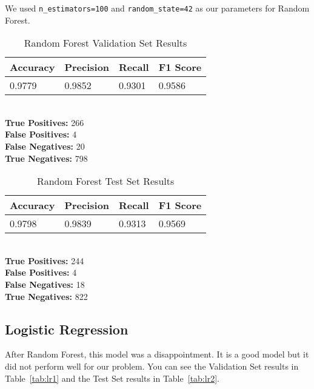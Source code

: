 \documentclass[conference]{IEEEtran}
\begin{document}
We used \verb|n_estimators=100| and \verb|random_state=42| as our parameters for Random Forest.

\begin{table}[H]
    \caption{Random Forest Validation Set Results}

    \begin{tabularx}{\linewidth}{|X|X|X|X|}
        \hline
        \textbf{Accuracy} & \textbf{Precision} & \textbf{Recall} & \textbf{F1 Score} \\
        \hline
        0.9779 & 0.9852 & 0.9301 & 0.9586 \\
        \hline
    \end{tabularx}\\

    \textbf{True Positives:} 266\\
    \textbf{False Positives:} 4\\
    \textbf{False Negatives:} 20\\
    \textbf{True Negatives:} 798
    \label{tab:rf1}
\end{table}

\begin{table}[H]
    \caption{Random Forest Test Set Results}

    \begin{tabularx}{\linewidth}{|X|X|X|X|}
        \hline
        \textbf{Accuracy} & \textbf{Precision} & \textbf{Recall} & \textbf{F1 Score} \\
        \hline
        0.9798 & 0.9839 & 0.9313 & 0.9569 \\
        \hline
    \end{tabularx}\\

    \textbf{True Positives:} 244\\
    \textbf{False Positives:} 4\\
    \textbf{False Negatives:} 18\\
    \textbf{True Negatives:} 822
    \label{tab:rf2}
\end{table}

\subsection{Logistic Regression}

After Random Forest, this model was a disappointment. It is a good model but it did not perform well for our problem. You can see the Validation Set results in Table \ref{tab:lr1} and the Test Set results in Table \ref{tab:lr2}.
\end{document}
